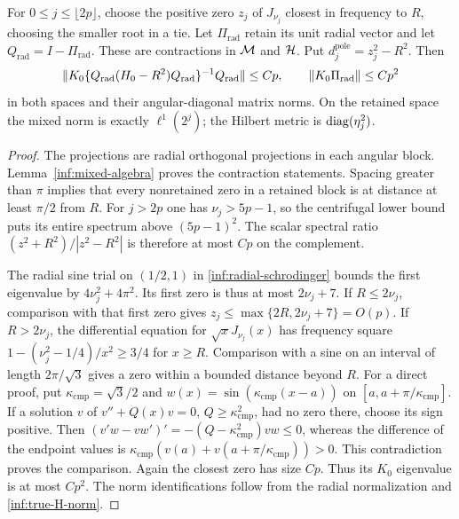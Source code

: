 \begin{lemma}\label{inf:radial-poles}
For $0\le j\le\lfloor2p\rfloor$, choose the positive zero $z_j$
of $J_{\nu_j}$ closest in frequency to $R$, choosing the smaller
root in a tie. Let $\Pi_{\mathrm{rad}}$ retain its unit radial vector
and let $Q_{\mathrm{rad}}=I-\Pi_{\mathrm{rad}}$. These are contractions
in $\mathcal M$ and $\mathcal{H}$. Put $d_j^{\mathrm{pole}}=z_j^2-R^2$. Then
\begin{equation}\label{inf:radial-pole-bounds}
 \lVert K_0\{Q_{\mathrm{rad}}(H_0-R^2)Q_{\mathrm{rad}}\}^{-1}
                        Q_{\mathrm{rad}}\rVert\le Cp,
 \qquad \lVert K_0\Pi_{\mathrm{rad}}\rVert\le Cp^2
\end{equation}
in both spaces and their angular-diagonal matrix norms.
On the retained space the mixed norm is exactly $\ell^1(2^j)$;
the Hilbert metric is $\operatorname{diag}(\eta_j^2)$.
\end{lemma}
\begin{proof}
The projections are radial orthogonal projections in each angular
block. Lemma~\ref{inf:mixed-algebra} proves the contraction statements.
Spacing greater than $\pi$ implies that every nonretained zero in a
retained block is at distance at least $\pi/2$ from $R$.
For $j>2p$ one has $\nu_j>5p-1$, so the centrifugal lower bound
puts its entire spectrum above $(5p-1)^2$. The scalar spectral
ratio $(z^2+R^2)/|z^2-R^2|$ is therefore at most $Cp$ on the
complement.

The radial sine trial on $(1/2,1)$ in
\eqref{inf:radial-schrodinger} bounds the first eigenvalue by
$4\nu_j^2+4\pi^2$. Its first zero is thus at most $2\nu_j+7$.
If $R\le2\nu_j$, comparison with that first zero gives
$z_j\le\max\{2R,2\nu_j+7\}=O(p)$.
If $R>2\nu_j$, the differential equation for
$\sqrt xJ_{\nu_j}(x)$ has frequency square
$1-(\nu_j^2-1/4)/x^2\ge3/4$ for $x\ge R$.
Comparison with a sine on an interval of length
$2\pi/\sqrt3$ gives a zero within a bounded distance beyond $R$.
For a direct proof, put $\kappa_{\mathrm{cmp}}=\sqrt3/2$ and
$w(x)=\sin(\kappa_{\mathrm{cmp}}(x-a))$ on
$[a,a+\pi/\kappa_{\mathrm{cmp}}]$. If a solution $v$ of
$v''+Q(x)v=0$, $Q\ge\kappa_{\mathrm{cmp}}^2$, had no zero there,
choose its sign positive. Then
$(v'w-vw')'=-(Q-\kappa_{\mathrm{cmp}}^2)vw\le0$,
whereas the difference of the endpoint values is
$\kappa_{\mathrm{cmp}}(v(a)+v(a+\pi/\kappa_{\mathrm{cmp}}))>0$.
This contradiction proves the comparison.
Again the closest zero has size $Cp$. Thus its $K_0$ eigenvalue is
at most $Cp^2$. The norm identifications follow from the radial
normalization and \eqref{inf:true-H-norm}.
\end{proof}

